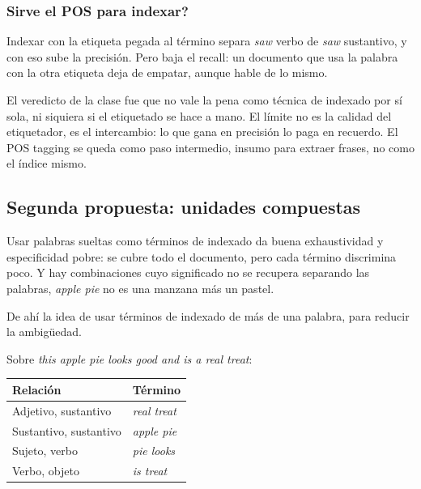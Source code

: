 \documentclass[11pt,letterpaper]{article}
\begin{document}
\subsubsection*{Sirve el POS para indexar?}

Indexar con la etiqueta pegada al término separa \textit{saw} verbo de
\textit{saw} sustantivo, y con eso sube la precisión. Pero baja el
recall: un documento que usa la palabra con la otra etiqueta deja de
empatar, aunque hable de lo mismo.

\begin{ojo}
    El veredicto de la clase fue que no vale la pena como técnica de
    indexado por sí sola, ni siquiera si el etiquetado se hace a mano.
    El límite no es la calidad del etiquetador, es el intercambio:
    lo que gana en precisión lo paga en recuerdo. El POS tagging se
    queda como paso intermedio, insumo para extraer frases, no como el
    índice mismo.
\end{ojo}

\subsection*{Segunda propuesta: unidades compuestas}

Usar palabras sueltas como términos de indexado da buena exhaustividad
y especificidad pobre: se cubre todo el documento, pero cada término
discrimina poco. Y hay combinaciones cuyo significado no se recupera
separando las palabras, \textit{apple pie} no es una manzana más un
pastel.

De ahí la idea de usar términos de indexado de más de una palabra,
para reducir la ambigüedad.

\begin{ejemplo}
    Sobre \textit{this apple pie looks good and is a real treat}:
    \begin{center}
    \begin{tabular}{ll}
        \toprule
        \textbf{Relación} & \textbf{Término} \\
        \midrule
        Adjetivo, sustantivo   & \textit{real treat} \\
        Sustantivo, sustantivo & \textit{apple pie} \\
        Sujeto, verbo          & \textit{pie looks} \\
        Verbo, objeto          & \textit{is treat} \\
        \bottomrule
    \end{tabular}
    \end{center}
\end{ejemplo}
\end{document}
